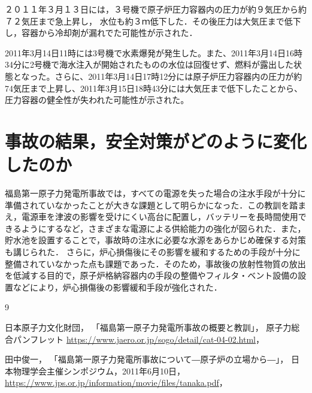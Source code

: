 \documentclass{ltjsarticle}  %
\begin{document}
２０１１年３月１３日には，３号機で原子炉圧力容器内の圧力が約９気圧から約７２気圧まで急上昇し，
水位も約３ｍ低下した．その後圧力は大気圧まで低下し，容器から冷却剤が漏れでた可能性が示された．

2011年3月14日11時には3号機で水素爆発が発生した。また、2011年3月14日16時34分に2号機で海水注入が開始されたものの水位は回復せず、燃料が露出した状態となった。さらに、2011年3月14日17時12分には原子炉圧力容器内の圧力が約74気圧まで上昇し、2011年3月15日18時43分には大気圧まで低下したことから、圧力容器の健全性が失われた可能性が示された。\cite{tanaka}

\section{事故の結果，安全対策がどのように変化したのか}
福島第一原子力発電所事故では，すべての電源を失った場合の注水手段が十分に準備されていなかったことが大きな課題として明らかになった．この教訓を踏まえ，電源車を津波の影響を受けにくい高台に配置し，バッテリーを長時間使用できるようにするなど，さまざまな電源による供給能力の強化が図られた．また，貯水池を設置することで，事故時の注水に必要な水源をあらかじめ確保する対策も講じられた．
さらに，炉心損傷後にその影響を緩和するための手段が十分に整備されていなかった点も課題であった．そのため，事故後の放射性物質の放出を低減する目的で，原子炉格納容器内の手段の整備やフィルタ・ベント設備の設置などにより，炉心損傷後の影響緩和手段が強化された．
\cite{jaero}

\begin{thebibliography}{9}

	日本原子力文化財団，
	「福島第一原子力発電所事故の概要と教訓」，
	原子力総合パンフレット
	\url{https://www.jaero.or.jp/sogo/detail/cat-04-02.html}，

	田中俊一，
	「福島第一原子力発電所事故について―原子炉の立場から―」，
	日本物理学会主催シンポジウム，2011年6月10日，
	\url{https://www.jps.or.jp/information/movie/files/tanaka.pdf}，

\end{thebibliography}
\end{document}
